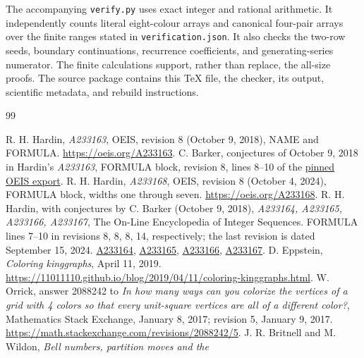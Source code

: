 \documentclass[11pt]{article}
\begin{document}
The accompanying \texttt{verify.py} uses exact integer and rational
arithmetic. It independently counts literal eight-colour arrays and
canonical four-pair arrays over the finite ranges stated in
\texttt{verification.json}. It also checks the two-row seeds, boundary
continuations, recurrence coefficients, and generating-series numerator.
The finite calculations support, rather than replace, the all-size proofs.
The source package contains this TeX file, the checker, its output,
scientific metadata, and rebuild instructions.

\begin{thebibliography}{99}\small\raggedright
\setlength{\itemsep}{0pt}
R. H. Hardin, \emph{A233163}, OEIS, revision 8 (October 9, 2018),
NAME and FORMULA.
\url{https://oeis.org/A233163}.
C. Barker, conjectures of October 9, 2018 in Hardin's \emph{A233163},
FORMULA block, revision 8, lines 8--10 of the
\href{https://raw.githubusercontent.com/oeis/oeisdata/571197984aeda7b8b680fe3a1f6a43f9898cd441/seq/A233/A233163.seq}{pinned OEIS export}.
R. H. Hardin, \emph{A233168}, OEIS, revision 8 (October 4, 2024),
FORMULA block, widths one through seven.
\url{https://oeis.org/A233168}.
R. H. Hardin, with conjectures by C. Barker (October 9, 2018),
\emph{A233164, A233165, A233166, A233167},
The On-Line Encyclopedia of Integer Sequences.
FORMULA lines 7--10 in revisions 8, 8, 8, 14, respectively;
the last revision is dated September 15, 2024.
\href{https://raw.githubusercontent.com/oeis/oeisdata/571197984aeda7b8b680fe3a1f6a43f9898cd441/seq/A233/A233164.seq}{A233164},
\href{https://raw.githubusercontent.com/oeis/oeisdata/571197984aeda7b8b680fe3a1f6a43f9898cd441/seq/A233/A233165.seq}{A233165},
\href{https://raw.githubusercontent.com/oeis/oeisdata/571197984aeda7b8b680fe3a1f6a43f9898cd441/seq/A233/A233166.seq}{A233166},
\href{https://raw.githubusercontent.com/oeis/oeisdata/571197984aeda7b8b680fe3a1f6a43f9898cd441/seq/A233/A233167.seq}{A233167}.
D. Eppstein, \emph{Coloring kinggraphs}, April 11, 2019.
\url{https://11011110.github.io/blog/2019/04/11/coloring-kinggraphs.html}.
W. Orrick, answer 2088242 to \emph{In how many ways can you colorize the
vertices of a grid with 4 colors so that every unit-square vertices are all
of a different color?}, Mathematics Stack Exchange, January 8, 2017;
revision 5, January 9, 2017.
\url{https://math.stackexchange.com/revisions/2088242/5}.
J. R. Britnell and M. Wildon, \emph{Bell numbers, partition moves and the
}
\end{thebibliography}
\end{document}
